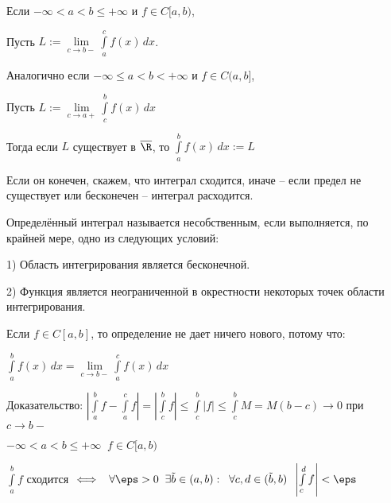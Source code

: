 
\newcommand\abs[1]{\left|#1\right|}

\begin{definition} \thmslashn 
	
	Если $-\infty < a < b \le +\infty$ и  $f \in C[a,b)$,
	 
	Пусть $L := \lim\limits_{c \to b-} \int\limits_a^c f(x) \, dx$.
	
	Аналогично если $-\infty \le a < b < +\infty$ и $f \in C(a,b]$,
	
	Пусть $L := \lim\limits_{c \to a+} \int\limits_c^b f(x) \, dx$
	
	
	Тогда если $L$ существует в $\overline{\R}$, то $\int\limits_a^b f(x)\,dx := L$
	
	Если он конечен, скажем, что интеграл сходится, иначе -- если предел не существует или бесконечен -- интеграл расходится.
	
	Определённый интеграл называется несобственным, если выполняется, по крайней мере, одно из следующих условий:
	
	1) Область интегрирования является бесконечной.
	
	2) Функция является неограниченной в окрестности некоторых точек области интегрирования.
	
\end{definition}

\begin{remark}\slashns
	
	Если $f \in C[a,b]$, то определение не дает ничего нового, потому что:
	
	$\int\limits_a^b f(x) \, dx = \lim\limits_{c \to b-} \int\limits_a^c f(x) \, dx$
	
	Доказательство: $\abs{\int\limits_a^b f - \int\limits_a^c f} = \abs{\int\limits_c^b f} \le \int\limits_c^b \abs{f} \le \int\limits_c^b M = M(b-c) \to 0$ при $c \to b-$
	
\end{remark}

\begin{theorem}\slashns
	
	$-\infty < a < b \le +\infty \;\; f\in C[a,b)$
	
	$\int\limits_a^b f$ сходится $\iff \;\; \forall \eps > 0 \;\;  \exists \tilde{b} \in (a,b) : \;\; \forall c, d \in (\tilde{b}, b) \;\; \abs{\int\limits_c^d f} < \eps$ 
\end{theorem}

